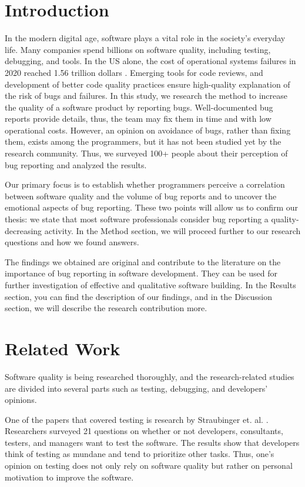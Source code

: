 \documentclass[11pt,review,sigplan,nonacm,natbib=false]{acmart}
\begin{document}
\section{Introduction}

In the modern digital age, software plays a vital role in the society's everyday life. Many companies spend billions on software quality, including testing, debugging, and tools. In the US alone, the cost of operational systems failures in 2020 reached 1.56 trillion dollars \cite{PoorCost}. Emerging tools for code reviews, and development of better code quality practices \cite{CodePractices} ensure high-quality explanation of the risk of bugs and failures. In this study, we research the method to increase the quality of a software product by reporting bugs. Well-documented bug reports provide details, thus, the team may fix them in time and with low operational costs. However, an opinion on avoidance of bugs, rather than fixing them, exists among the programmers, but it has not been studied yet by the research community. Thus, we surveyed 100+ people about their perception of bug reporting and analyzed the results.

Our primary focus is to establish whether programmers perceive a correlation between software quality and the volume of bug reports and to uncover the emotional aspects of bug reporting. These two points will allow us to confirm our thesis: we state that most software professionals consider bug reporting a quality-decreasing activity. In the Method section, we will proceed further to our research questions and how we found answers.

The findings we obtained are original and contribute to the literature on the importance of bug reporting in software development. They can be used for further investigation of effective and qualitative software building. In the Results section, you can find the description of our findings, and in the Discussion section, we will describe the research contribution more.

\section{Related Work}

Software quality is being researched thoroughly, and the research-related studies are divided into several parts such as testing, debugging, and developers’ opinions.

One of the papers that covered testing is research by Straubinger et. al. \cite{Testing}. Researchers surveyed 21 questions on whether or not developers, consultants, testers, and managers want to test the software. The results show that developers think of testing as mundane and tend to prioritize other tasks. Thus, one’s opinion on testing does not only rely on software quality but rather on personal motivation to improve the software. 
\end{document}
